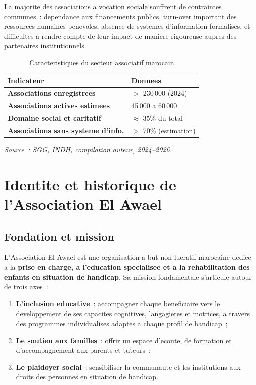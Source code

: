 \documentclass[12pt,a4paper,openany]{report}
\begin{document}
\vspace{0.3cm}
La majorite des associations a vocation sociale souffrent de contraintes
communes~: dependance aux financements publics, turn-over important des
ressources humaines benevoles, absence de systemes d'information
formalises, et difficultes a rendre compte de leur impact de maniere
rigoureuse aupres des partenaires institutionnels.

\begin{table}[H]
\centering
\caption{Caracteristiques du secteur associatif marocain}
\label{tab:secteur}
\begin{tabularx}{\textwidth}{>{\bfseries}lX}
\toprule
Indicateur & Donnees\\
\midrule
Associations enregistrees & $>$ 230\,000 (2024)\\
Associations actives estimees & 45\,000 a 60\,000\\
Domaine social et caritatif & $\approx$ 35\% du total\\
Associations sans systeme d'info. & $>$ 70\% (estimation)\\
\bottomrule
\end{tabularx}
\vspace{0.1cm}
\small\textit{Source~: SGG, INDH, compilation auteur, 2024--2026.}
\end{table}

\section{Identite et historique de l'Association El Awael}

\subsection{Fondation et mission}

L'Association El Awael est une organisation a but non lucratif marocaine
dediee a la \textbf{prise en charge, a l'education specialisee et a la
rehabilitation des enfants en situation de handicap}. Sa mission
fondamentale s'articule autour de trois axes~:

\begin{enumerate}
  \item \textbf{L'inclusion educative}~: accompagner chaque beneficiaire
    vers le developpement de ses capacites cognitives, langagieres et
    motrices, a travers des programmes individualises adaptes a chaque
    profil de handicap~;
  \item \textbf{Le soutien aux familles}~: offrir un espace d'ecoute,
    de formation et d'accompagnement aux parents et tuteurs~;
  \item \textbf{Le plaidoyer social}~: sensibiliser la communaute et
    les institutions aux droits des personnes en situation de handicap.
\end{enumerate}
\end{document}
